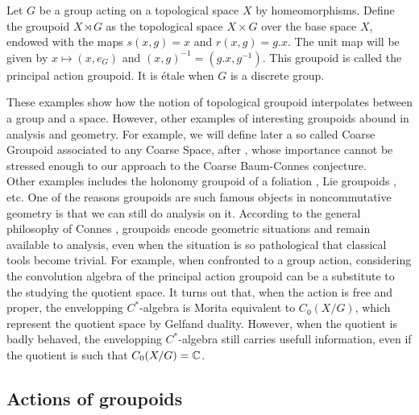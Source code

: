 \begin{Expl} Let $G$ be a group acting on a topological space $X$ by homeomorphisms. Define the groupoid $X\rtimes G$ as the topological space $X\times G$ over the base space $X$, endowed with the maps $s(x,g)=x$ and $r(x,g)=g.x$. The unit map will be given by $x\mapsto (x,e_G)$ and $(x,g)^{-1} = (g.x , g^{-1})$. This groupoid is called the principal action groupoid. It is étale when $G$ is a discrete group.  
\end{Expl}

These examples show how the notion of topological groupoid interpolates between a group and a space. However, other examples of interesting groupoids abound in analysis and geometry. For example, we will define later a so called Coarse Groupoid associated to any Coarse Space, after \cite{SkTuYu}, whose importance cannot be stressed enough to our approach to the Coarse Baum-Connes conjecture.\\

Other examples includes the holonomy groupoid of a foliation \cite{connesfoliations}, Lie groupoids \cite{paterson}, etc. One of the reasons groupoids are such famous objects in noncommutative geometry is that we can still do analysis on it. According to the general philosophy of Connes \cite{Connes94}, groupoids encode geometric situations and remain available to analysis, even when the situation is so pathological that classical tools become trivial. For example, when confronted to a group action, considering the convolution algebra of the principal action groupoid can be a substitute to the studying the quotient space. It turns out that, when the action is free and proper, the envelopping $C^*$-algebra is Morita equivalent to $C_0(X/G)$, which represent the quotient space by Gelfand duality. However, when the quotient is badly behaved, the envelopping $C^*$-algebra still carries usefull information, even if the quotient  is such that $C_0(X/G) = \mathbb C$.

\subsection{Actions of groupoids}

